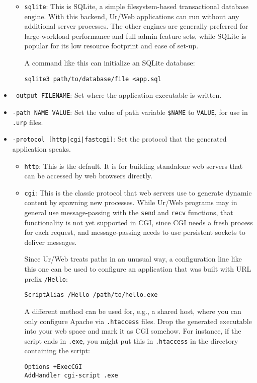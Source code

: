 \documentclass{article}
\begin{document}
\begin{itemize}
\begin{itemize}
  \item \texttt{sqlite}: This is SQLite, a simple filesystem-based transactional database engine.  With this backend, Ur/Web applications can run without any additional server processes.  The other engines are generally preferred for large-workload performance and full admin feature sets, while SQLite is popular for its low resource footprint and ease of set-up.

    A command like this can initialize an SQLite database:
    \begin{verbatim}
sqlite3 path/to/database/file <app.sql
    \end{verbatim}
  \end{itemize}

\item \texttt{-output FILENAME}: Set where the application executable is written.

\item \texttt{-path NAME VALUE}: Set the value of path variable \texttt{\$NAME} to \texttt{VALUE}, for use in \texttt{.urp} files.

\item \texttt{-protocol [http|cgi|fastcgi]}: Set the protocol that the generated application speaks.
  \begin{itemize}
  \item \texttt{http}: This is the default.  It is for building standalone web servers that can be accessed by web browsers directly.

  \item \texttt{cgi}: This is the classic protocol that web servers use to generate dynamic content by spawning new processes.  While Ur/Web programs may in general use message-passing with the \texttt{send} and \texttt{recv} functions, that functionality is not yet supported in CGI, since CGI needs a fresh process for each request, and message-passing needs to use persistent sockets to deliver messages.

    Since Ur/Web treats paths in an unusual way, a configuration line like this one can be used to configure an application that was built with URL prefix \texttt{/Hello}:
    \begin{verbatim}
ScriptAlias /Hello /path/to/hello.exe
    \end{verbatim}

    A different method can be used for, e.g., a shared host, where you can only configure Apache via \texttt{.htaccess} files.  Drop the generated executable into your web space and mark it as CGI somehow.  For instance, if the script ends in \texttt{.exe}, you might put this in \texttt{.htaccess} in the directory containing the script:
    \begin{verbatim}
Options +ExecCGI
AddHandler cgi-script .exe
    \end{verbatim}


\end{itemize}
\end{itemize}
\end{document}
